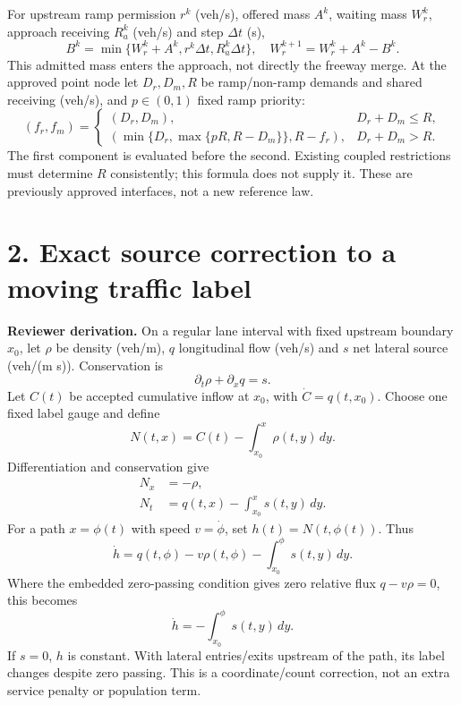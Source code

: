 \documentclass[11pt,a4paper]{article}
\begin{document}
For upstream ramp permission $r^k$ (veh/s), offered mass $A^k$, waiting mass
$W_r^k$, approach receiving $R_a^k$ (veh/s) and step $\Delta t$ (s),
\begin{equation}
B^k=\min\{W_r^k+A^k,r^k\Delta t,R_a^k\Delta t\},\quad
W_r^{k+1}=W_r^k+A^k-B^k.
\end{equation}
This admitted mass enters the approach, not directly the freeway merge.
At the approved point node let $D_r,D_m,R$ be ramp/non-ramp demands and shared
receiving (veh/s), and $p\in(0,1)$ fixed ramp priority:
\begin{equation}
(f_r,f_m)=
\begin{cases}
(D_r,D_m),&D_r+D_m\le R,\\
(\min\{D_r,\max\{pR,R-D_m\}\},R-f_r),&D_r+D_m>R.
\end{cases}
\end{equation}
The first component is evaluated before the second. Existing coupled
restrictions must determine $R$ consistently; this formula does not supply it.
These are previously approved interfaces, not a new reference law.

\newpage
\section*{2. Exact source correction to a moving traffic label}
\textbf{Reviewer derivation.} On a regular lane interval with fixed upstream
boundary $x_0$, let $\rho$ be density (veh/m), $q$ longitudinal flow (veh/s)
and $s$ net lateral source (veh/(m s)). Conservation is
\begin{equation}
\partial_t\rho+\partial_xq=s.
\end{equation}
Let $C(t)$ be accepted cumulative inflow at $x_0$, with $\dot C=q(t,x_0)$.
Choose one fixed label gauge and define
\begin{equation}
N(t,x)=C(t)-\int_{x_0}^{x}\rho(t,y)\,dy.
\end{equation}
Differentiation and conservation give
\begin{align}
N_x&=-\rho,\\
N_t&=q(t,x)-\int_{x_0}^{x}s(t,y)\,dy.
\end{align}
For a path $x=\phi(t)$ with speed $v=\dot\phi$, set
$h(t)=N(t,\phi(t))$. Thus
\begin{equation}
\dot h=q(t,\phi)-v\rho(t,\phi)-\int_{x_0}^{\phi}s(t,y)\,dy.
\end{equation}
Where the embedded zero-passing condition gives zero relative flux
$q-v\rho=0$, this becomes
\begin{equation}
\dot h=-\int_{x_0}^{\phi}s(t,y)\,dy.
\end{equation}
If $s=0$, $h$ is constant. With lateral entries/exits upstream of the path,
its label changes despite zero passing. This is a coordinate/count correction,
not an extra service penalty or population term.
\end{document}
